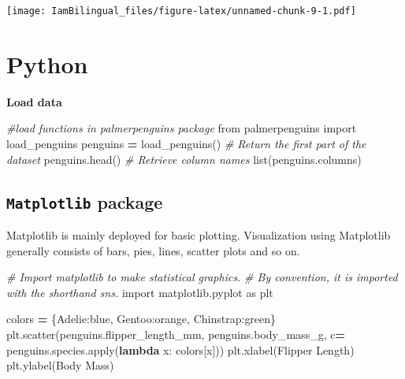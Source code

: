 \documentclass[
]{book}
\newenvironment{Shaded}{\begin{snugshade}}{\end{snugshade}}
\newcommand{\BuiltInTok}[1]{#1}
\newcommand{\CommentTok}[1]{\textcolor[rgb]{0.56,0.35,0.01}{\textit{#1}}}
\newcommand{\ImportTok}[1]{#1}
\newcommand{\KeywordTok}[1]{\textcolor[rgb]{0.13,0.29,0.53}{\textbf{#1}}}
\newcommand{\NormalTok}[1]{#1}
\newcommand{\OperatorTok}[1]{\textcolor[rgb]{0.81,0.36,0.00}{\textbf{#1}}}
\newcommand{\StringTok}[1]{\textcolor[rgb]{0.31,0.60,0.02}{#1}}
\begin{document}
\texttt{[image: IamBilingual\_files/figure-latex/unnamed-chunk-9-1.pdf]}

\hypertarget{python-5}{%
\section{Python}\label{python-5}}

\textbf{Load data}

\begin{Shaded}
\begin{Highlighting}[]
\CommentTok{\#load functions in palmerpenguins package}
\ImportTok{from}\NormalTok{ palmerpenguins }\ImportTok{import}\NormalTok{ load\_penguins}
\NormalTok{penguins }\OperatorTok{=}\NormalTok{ load\_penguins()}
\CommentTok{\# Return the first part of the dataset}
\NormalTok{penguins.head()}
\CommentTok{\# Retrieve column names}
\BuiltInTok{list}\NormalTok{(penguins.columns)}
\end{Highlighting}
\end{Shaded}

\hypertarget{matplotlib-package}{%
\subsection{\texorpdfstring{\texttt{Matplotlib} package}{Matplotlib package}}\label{matplotlib-package}}

Matplotlib is mainly deployed for basic plotting. Visualization using Matplotlib generally consists of bars, pies, lines, scatter plots and so on.

\begin{Shaded}
\begin{Highlighting}[]
\CommentTok{\# Import matplotlib to make statistical graphics. }
\CommentTok{\# By convention, it is imported with the shorthand sns.}
\ImportTok{import}\NormalTok{ matplotlib.pyplot }\ImportTok{as}\NormalTok{ plt}

\NormalTok{colors }\OperatorTok{=}\NormalTok{ \{}\StringTok{\textquotesingle{}Adelie\textquotesingle{}}\NormalTok{:}\StringTok{\textquotesingle{}blue\textquotesingle{}}\NormalTok{, }\StringTok{\textquotesingle{}Gentoo\textquotesingle{}}\NormalTok{:}\StringTok{\textquotesingle{}orange\textquotesingle{}}\NormalTok{, }\StringTok{\textquotesingle{}Chinstrap\textquotesingle{}}\NormalTok{:}\StringTok{\textquotesingle{}green\textquotesingle{}}\NormalTok{\}}
\NormalTok{plt.scatter(penguins.flipper\_length\_mm,}
\NormalTok{penguins.body\_mass\_g, }
\NormalTok{c}\OperatorTok{=}\NormalTok{ penguins.species.}\BuiltInTok{apply}\NormalTok{(}\KeywordTok{lambda}\NormalTok{ x: colors[x]))}
\NormalTok{plt.xlabel(}\StringTok{\textquotesingle{}Flipper Length\textquotesingle{}}\NormalTok{)}
\NormalTok{plt.ylabel(}\StringTok{\textquotesingle{}Body Mass\textquotesingle{}}\NormalTok{)}
\end{Highlighting}
\end{Shaded}
\end{document}
